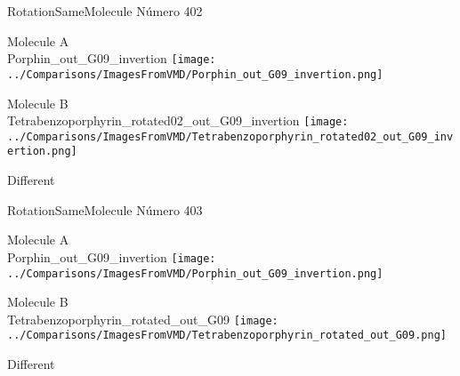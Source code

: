 \vtab[-3cm]
\begin{center}
{\large RotationSameMolecule \tab Número 402}
\end{center}
\begin{multicols}{2}
\begin{center}
Molecule A \\ 
Porphin\_out\_G09\_invertion
\texttt{[image: ../Comparisons/ImagesFromVMD/Porphin\_out\_G09\_invertion.png]}
\\
\vtab

\columnbreak
Molecule B \\ 
Tetrabenzoporphyrin\_rotated02\_out\_G09\_invertion
\texttt{[image: ../Comparisons/ImagesFromVMD/Tetrabenzoporphyrin\_rotated02\_out\_G09\_invertion.png]}
\\
\vtab


\end{center}
\end{multicols}
\begin{center}
\textcolor{NavyBlue}{\Large Different}
\end{center}

 \newpage

\vtab[-3cm]
\begin{center}
{\large RotationSameMolecule \tab Número 403}
\end{center}
\begin{multicols}{2}
\begin{center}
Molecule A \\ 
Porphin\_out\_G09\_invertion
\texttt{[image: ../Comparisons/ImagesFromVMD/Porphin\_out\_G09\_invertion.png]}
\\
\vtab

\columnbreak
Molecule B \\ 
Tetrabenzoporphyrin\_rotated\_out\_G09
\texttt{[image: ../Comparisons/ImagesFromVMD/Tetrabenzoporphyrin\_rotated\_out\_G09.png]}
\\
\vtab


\end{center}
\end{multicols}
\begin{center}
\textcolor{NavyBlue}{\Large Different}
\end{center}

 \newpage

